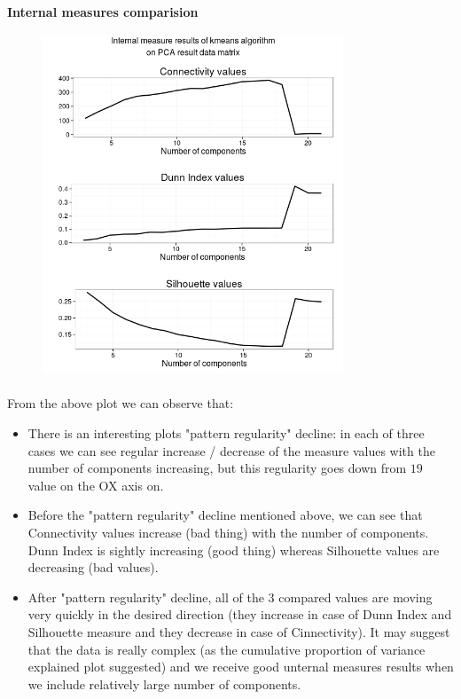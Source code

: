\documentclass[10pt]{article}\usepackage[]{graphicx}\usepackage[]{color}
\begin{document}
\clearpage
\clearpage
\paragraph{Internal measures comparision} 
\begin{figure}[h!]
\centering
\includegraphics[width=0.8\textwidth]{Plots2/pca-internal.png}
\end{figure}
\paragraph{}

From the above plot we can observe that:
\begin{itemize}
\item There is an interesting plots "pattern regularity" decline: in each 
of three cases we can see regular increase / decrease of the measure values
with the number of components increasing, but this regularity goes down 
from $19$ value on the OX axis on.
\item Before the "pattern regularity" decline mentioned above, we can see that
Connectivity values increase (bad thing) with the number of components. Dunn Index is sightly
increasing (good thing) whereas Silhouette values are decreasing (bad values). 
\item After  "pattern regularity" decline, all of the 3 compared values 
are moving very quickly in the desired direction (they increase in case of Dunn Index
and Silhouette measure and they decrease in case of Cinnectivity). It may
suggest that the data is really complex (as the cumulative proportion
of variance explained plot suggested) and we receive good unternal measures 
results when we include relatively large number of components.
\end{itemize}
\end{document}
